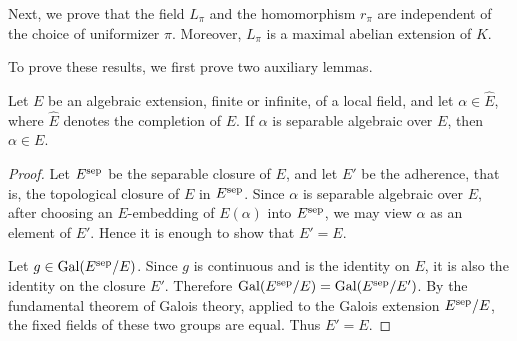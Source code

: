 




Next, we prove that the field $L_\pi$ and the homomorphism $r_\pi$ are
independent of the choice of uniformizer $\pi$.
Moreover, $L_\pi$ is a maximal abelian extension of $K$.

To prove these results, we first prove two auxiliary lemmas.

\begin{lemma}
    Let $E$ be an algebraic extension, finite or infinite, of a local field, and
    let $\alpha \in \widehat{E}$, where $\widehat{E}$ denotes the completion of
    $E$. If $\alpha$ is separable algebraic over $E$, then $\alpha \in E$.
    \label{lem: sep_mem}
\end{lemma}

\begin{proof}
    Let $E^{\mathrm{sep}}$ be the separable closure of $E$, and let $E'$ be the
    adherence, that is, the topological closure of $E$ in $E^{\mathrm{sep}}$.
    Since $\alpha$ is separable algebraic over $E$, after choosing an
    $E$-embedding of $E(\alpha)$ into $E^{\mathrm{sep}}$, we may view $\alpha$ as
    an element of $E'$. Hence it is enough to show that $E'=E$.

    Let $g \in \mathrm{Gal}(E^{\mathrm{sep}}/E)$. Since $g$ is continuous and is the identity
    on $E$, it is also the identity on the closure $E'$. Therefore
    $\mathrm{Gal}(E^{\mathrm{sep}}/E)=\mathrm{Gal}(E^{\mathrm{sep}}/E')$. By the fundamental theorem of
    Galois theory, applied to the Galois extension $E^{\mathrm{sep}}/E$, the fixed
    fields of these two groups are equal. Thus $E'=E$.
\end{proof}

